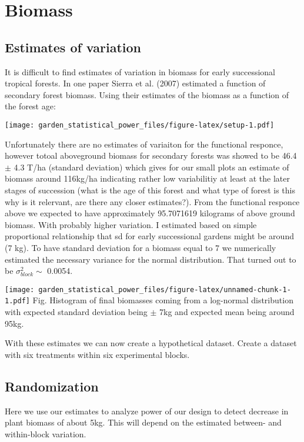 \documentclass[]{article}
\begin{document}
\section{Biomass}\label{biomass}

\subsection{Estimates of variation}\label{estimates-of-variation}

It is difficult to find estimates of variation in biomass for early
successional tropical forests. In one paper Sierra et al. (2007)
estimated a function of secondary forest biomass. Using their estimates
of the biomass as a function of the forest age:

\texttt{[image: garden\_statistical\_power\_files/figure-latex/setup-1.pdf]}

Unfortunately there are no estimates of variaiton for the functional
responce, however totoal aboveground biomass for secondary forests was
showed to be 46.4 \(\pm\) 4.3 T/ha (standard deviation) which gives for
our small plots an estimate of biomass around 116kg/ha indicating rather
low variabilitiy at least at the later stages of succession (what is the
age of this forest and what type of forest is this why is it relervant,
are there any closer estimates?). From the functional responce above we
expected to have approximately 95.7071619 kilograms of above ground
biomass. With probably higher variation. I estimated based on simple
proportional relationship that sd for early successional gardens might
be around (7 kg). To have standard deviation for a biomass equal to 7 we
numerically estimated the necessary variance for the normal
distribution. That turned out to be \(\sigma^2_{block} \sim\) 0.0054.

\texttt{[image: garden\_statistical\_power\_files/figure-latex/unnamed-chunk-1-1.pdf]}
Fig. Histogram of final biomasses coming from a log-normal distribution
with expected standard deviation being \(\pm\) 7kg and expected mean
being around 95kg.

With these estimates we can now create a hypothetical dataset. Create a
dataset with six treatments within six experimental blocks.

\subsection{Randomization}\label{randomization}

Here we use our estimates to analyze power of our design to detect
decrease in plant biomass of about 5kg. This will depend on the
estimated between- and within-block variation.
\end{document}
